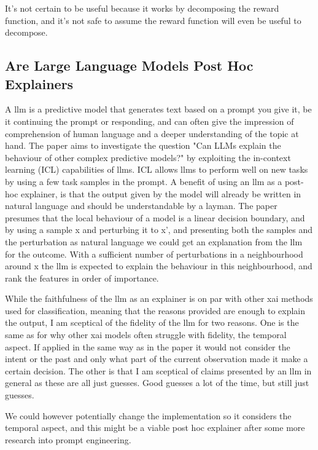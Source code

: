\documentclass[UKenglish]{uiomasterthesis}
\begin{document}
It's not certain to be useful because it works by decomposing the reward function, and it's not safe to assume the reward function will even be useful to decompose.


\subsection{Are Large Language Models Post Hoc Explainers}
A \ac{llm} is a predictive model that generates text based on a prompt you give it, be it continuing the prompt or responding, and can often give the impression of comprehension of human language and a deeper understanding of the topic at hand.  The paper aims to investigate the question "Can LLMs explain the behaviour of other complex predictive models?" by exploiting the in-context learning (ICL) capabilities of \acp{llm}. ICL allows \acp{llm} to perform well on new tasks by using a few task samples in the prompt. A benefit of using an \ac{llm} as a post-hoc explainer, is that the output given by the model will already be written in natural language and should be understandable by a layman. The paper presumes that the local behaviour of a model is a linear decision boundary, and by using a sample x and perturbing it to x', and presenting both the samples and the perturbation as natural language we could get an explanation from the \ac{llm} for the outcome. With a sufficient number of perturbations in a neighbourhood around x the \ac{llm} is expected to explain the behaviour in this neighbourhood, and rank the features in order of importance.

While the faithfulness of the \ac{llm} as an explainer is on par with other \ac{xai} methods used for classification, meaning that the reasons provided are enough to explain the output, I am sceptical of the fidelity of the \ac{llm} for two reasons. One is the same as for why other \ac{xai} models often struggle with fidelity, the temporal aspect. If applied in the same way as in the paper it would not consider the intent or the past and only what part of the current observation made it make a certain decision. The other is that I am sceptical of claims presented by an \ac{llm} in general as these are all just guesses. Good guesses a lot of the time, but still just guesses. 

We could however potentially change the implementation so it considers the temporal aspect, and this might be a viable post hoc explainer after some more research into prompt engineering.
\end{document}

